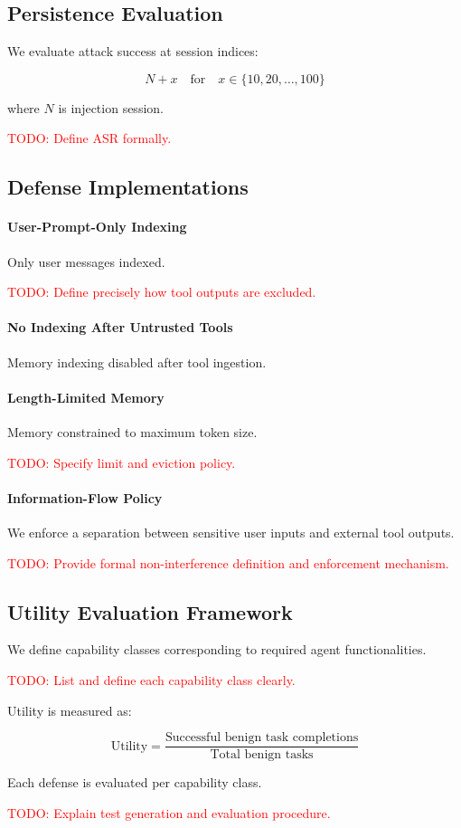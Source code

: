 \documentclass{article}
\newcommand{\TODO}[1]{\textcolor{red}{TODO: #1}}
\begin{document}
\subsection{Persistence Evaluation}

We evaluate attack success at session indices:

\[
N + x \quad \text{for} \quad x \in \{10,20,\dots,100\}
\]

where \(N\) is injection session.

\TODO{Define ASR formally.}

\subsection{Defense Implementations}

\paragraph{User-Prompt-Only Indexing}
Only user messages indexed.

\TODO{Define precisely how tool outputs are excluded.}

\paragraph{No Indexing After Untrusted Tools}
Memory indexing disabled after tool ingestion.

\paragraph{Length-Limited Memory}
Memory constrained to maximum token size.

\TODO{Specify limit and eviction policy.}

\paragraph{Information-Flow Policy}
We enforce a separation between sensitive user inputs and external tool outputs.

\TODO{Provide formal non-interference definition and enforcement mechanism.}

\subsection{Utility Evaluation Framework}

We define capability classes corresponding to required agent functionalities.

\TODO{List and define each capability class clearly.}

Utility is measured as:

\[
\text{Utility} = \frac{\text{Successful benign task completions}}{\text{Total benign tasks}}
\]

Each defense is evaluated per capability class.

\TODO{Explain test generation and evaluation procedure.}



\end{document}
